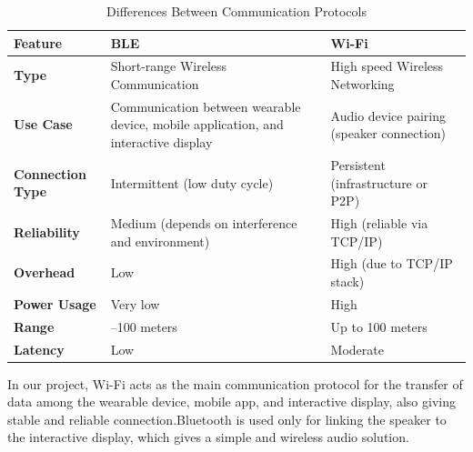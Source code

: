 \documentclass[a4paper,12pt]{report}
\begin{document}
\begin{table}[h]
\centering
\caption{ Differences Between Communication Protocols}
\vspace{0.5em}

\begin{tabular}{|>{\centering\arraybackslash}m{3.5cm}
                |>{\centering\arraybackslash}m{3.5cm}
                |>{\centering\arraybackslash}m{3.5cm}|}
\hline
\textbf{Feature} &
\textbf{BLE \cite{novelbits_ble_power}} &
\textbf{Wi-Fi \cite{techtarget_wifi}} \\
\hline

\textbf{Type} &
Short-range Wireless Communication &
High speed Wireless Networking \\
\hline

\textbf{Use Case} &
Communication between wearable device, mobile application, and interactive display  &
Audio device pairing (speaker connection) \\
\hline

\textbf{Connection Type} &
Intermittent (low duty cycle) &
Persistent (infrastructure or P2P) \\
\hline

\textbf{Reliability} &
Medium (depends on interference and environment) &
High (reliable via TCP/IP) \\
\hline

\textbf{Overhead} &
Low &
High (due to TCP/IP stack) \\
\hline

\textbf{Power Usage} &
Very low &
High \\
\hline

\textbf{Range} &
10--100 meters &
Up to 100 meters \\
\hline

\textbf{Latency} &
Low &
Moderate \\
\hline

\end{tabular}
\label{tab:ble_wifi_mqtt}
\end{table}

In our project, Wi-Fi acts as the main communication protocol for the transfer of data among the wearable device, mobile app, and interactive display, also giving stable and reliable connection.Bluetooth is used only for  linking the speaker to the interactive display, which gives a simple and wireless audio solution. 
\end{document}
